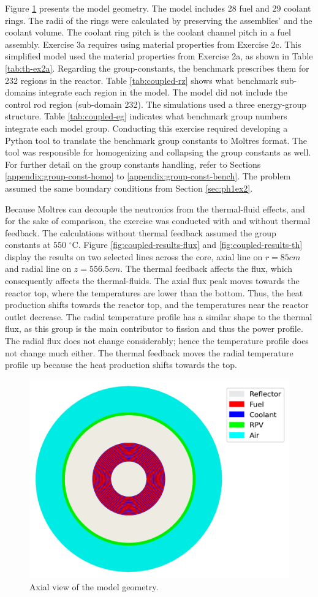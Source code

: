 Figure \ref{fig:coupled-mesh} presents the model geometry.
The model includes 28 fuel and 29 coolant rings.
The radii of the rings were calculated by preserving the assemblies' and the coolant volume.
The coolant ring pitch is the coolant channel pitch in a fuel assembly.
Exercise 3a requires using material properties from Exercise 2c.
This simplified model used the material properties from Exercise 2a, as shown in Table \ref{tab:th-ex2a}.
Regarding the group-constants, the benchmark prescribes them for 232 regions in the reactor.
Table \ref{tab:coupled-rz} shows what benchmark sub-domains integrate each region in the model.
The model did not include the control rod region (sub-domain 232).
The simulations used a three energy-group structure.
Table \ref{tab:coupled-eg} indicates what benchmark group numbers integrate each model group.
Conducting this exercise required developing a Python tool to translate the benchmark group constants to Moltres format.
The tool was responsible for homogenizing and collapsing the group constants as well.
For further detail on the group constants handling, refer to Sections \ref{appendix:group-const-homo} to \ref{appendix:group-const-bench}.
The problem assumed the same boundary conditions from Section \ref{sec:ph1ex2}.

Because Moltres can decouple the neutronics from the thermal-fluid effects, and for the sake of comparison, the exercise was conducted with and without thermal feedback.
The calculations without thermal feedback assumed the group constants at 550 $^{\circ}$C.
Figure \ref{fig:coupled-results-flux} and \ref{fig:coupled-results-th} display the results on two selected lines across the core, axial line on $r=85 cm$ and radial line on $z=556.5 cm$.
The thermal feedback affects the flux, which consequently affects the thermal-fluids.
The axial flux peak moves towards the reactor top, where the temperatures are lower than the bottom.
Thus, the heat production shifts towards the reactor top, and the temperatures near the reactor outlet decrease.
The radial temperature profile has a similar shape to the thermal flux, as this group is the main contributor to fission and thus the power profile.
The radial flux does not change considerably; hence the temperature profile does not change much either.
The thermal feedback moves the radial temperature profile up because the heat production shifts towards the top.

\begin{figure}[htbp!]
  \centering
  \includegraphics[width=0.50\linewidth]{figures-thermal/ex3-mesh}
  \hfill
  \caption{Axial view of the model geometry.}
  \label{fig:coupled-mesh}
\end{figure}

